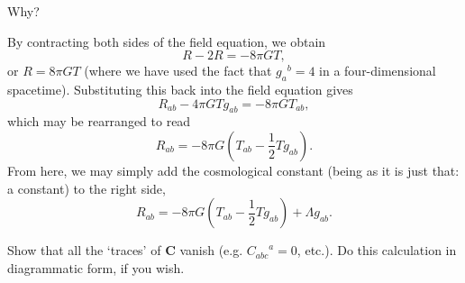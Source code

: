 \documentclass[../road-to-reality.tex]{subfiles}
\begin{document}
\begin{questions}
\question Why?

  \begin{solution}
    By contracting both sides of the field equation, we obtain
    \[
      R - 2R = -8\pi{G}T,
    \]
    or $R = 8\pi{G}T$ (where we have used the fact that ${g_a}^b = 4$ in a
    four-dimensional spacetime). Substituting this back into the field equation
    gives
    \[
      R_{ab} - 4\pi{G}Tg_{ab} = -8\pi{G}T_{ab},
    \]
    which may be rearranged to read
    \[
      R_{ab} = -8\pi{G}(T_{ab} - \frac{1}{2}Tg_{ab}).
    \]
    From here, we may simply add the cosmological constant (being as it is just
    that: a constant) to the right side,
\[
  R_{ab} = -8\pi{G}(T_{ab} - \frac{1}{2}Tg_{ab}) + \Lambda{g}_{ab}.
\]
  \end{solution}

\question Show that all the `traces' of $\mathbf{C}$ vanish (e.g.
  ${C_{abc}}^a=0$, etc.). Do this calculation in diagrammatic form, if you
  wish.
\end{questions}
\end{document}

